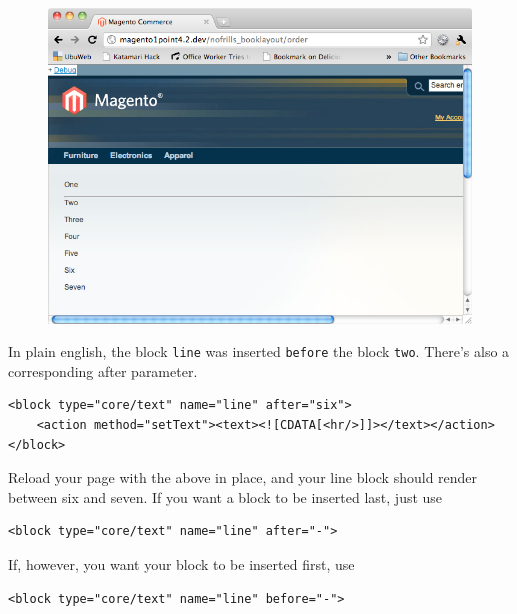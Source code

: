 \documentclass[oneside]{book}
\begin{document}
\begin{figure}[htb]
\begin{center}
\leavevmode
\includegraphics[width=1\textwidth]{images/chapter5/order-before-two.png}
\end{center}
\caption{}
\end{figure}


In plain english, the block \footnotesize\texttt{line} \normalsize  was inserted \footnotesize\texttt{before} \normalsize  the block \footnotesize\texttt{two}\normalsize.  There's also a corresponding after parameter.

\begin{lstlisting}
<block type="core/text" name="line" after="six">
    <action method="setText"><text><![CDATA[<hr/>]]></text></action>
</block>

\end{lstlisting}


Reload your page with the above in place, and your line block should render between six and seven.  If you want a block to be inserted last, just use

\begin{lstlisting}
<block type="core/text" name="line" after="-">

\end{lstlisting}


If, however, you want your block to be inserted first, use

\begin{lstlisting}
<block type="core/text" name="line" before="-">

\end{lstlisting}
\end{document}
